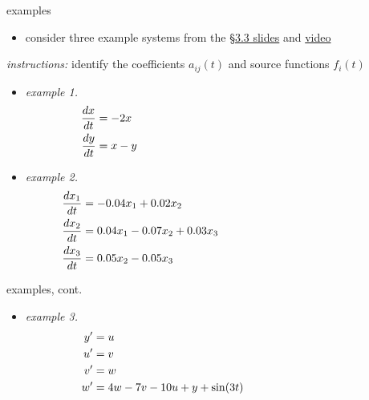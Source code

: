 \documentclass[dvipsnames,colorlinks]{beamer}
\begin{document}
\begin{frame}{examples}

\small
\begin{itemize}
\item consider three example systems from the \href{https://bueler.github.io/math302/assets/slides/3-3.pdf}{\S3.3 slides} and \href{https://drive.explaineverything.com/thecode/XAAUNGS}{video}
\end{itemize}

\noindent \emph{instructions:} identify the coefficients $a_{ij}(t)$ and source functions $f_i(t)$

\begin{itemize}
\item \emph{example 1.}
\begin{align*}
\frac{dx}{dt} &= - 2 x \hspace{70mm} \\
\frac{dy}{dt} &= x - y
\end{align*}
\item \emph{example 2.}
\begin{align*}
\frac{dx_1}{dt} &= -0.04 x_1 + 0.02 x_2 \hspace{60mm} \\
\frac{dx_2}{dt} &= 0.04 x_1 - 0.07 x_2 + 0.03 x_3 \\
\frac{dx_3}{dt} &= 0.05 x_2 - 0.05 x_3
\end{align*}
\end{itemize}
\end{frame}


\begin{frame}{examples, cont.}

\small
\begin{itemize}
\item \emph{example 3.}
\begin{align*}
y' &= u \hspace{75mm} \\
u' &= v \\
v' &= w \\
w' &= 4w-7v-10u+y+\sin(3t)
\end{align*}
\end{itemize}

\vspace{40mm}
\end{frame}
\end{document}
